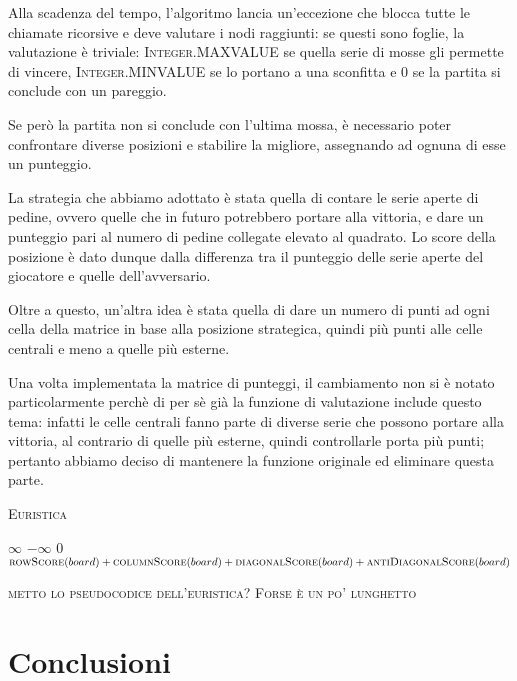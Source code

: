\documentclass{article}
\begin{document}
Alla scadenza del tempo, l'algoritmo lancia un'eccezione che blocca tutte le chiamate ricorsive e 
deve valutare i nodi raggiunti: se questi sono foglie, la valutazione è triviale: \textsc{Integer.MAXVALUE}
se quella serie di mosse gli permette di vincere, \textsc{Integer.MINVALUE} se lo portano a una sconfitta
e $0$ se la partita si conclude con un pareggio.

Se però la partita non si conclude con l'ultima mossa, è necessario poter confrontare diverse posizioni
e stabilire la migliore, assegnando ad ognuna di esse un punteggio.

La strategia che abbiamo adottato è stata quella di contare le serie aperte di pedine, ovvero quelle
che in futuro potrebbero portare alla vittoria, e dare un punteggio pari al numero di pedine collegate
elevato al quadrato. Lo score della posizione è dato dunque dalla differenza tra il punteggio delle serie
aperte del giocatore e quelle dell'avversario.

Oltre a questo, un'altra idea è stata quella di dare un numero di punti ad ogni cella della matrice
in base alla posizione strategica, quindi più punti alle celle centrali e meno a quelle più esterne.

Una volta implementata la matrice di punteggi, il cambiamento non si è notato particolarmente perchè
di per sè già la funzione di valutazione include questo tema: infatti le celle centrali fanno parte di
diverse serie che possono portare alla vittoria, al contrario di quelle più esterne, quindi controllarle porta
più punti; pertanto abbiamo deciso di mantenere la funzione originale ed eliminare questa parte.

\begin{algorithm}[H]
  \caption{\textsc{Euristica}}
  \label{alg:evaluate}
  \begin{algorithmic}
        \State \Return $\infty$
        \State \Return $-\infty$
        \State \Return $0$
      \Else
        \State \Return $\Call{rowScore}{board} + \Call{columnScore}{board} + 
        \Call{diagonalScore}{board} + \Call{antiDiagonalScore}{board}$
      \EndIf
    \EndProcedure      
  \end{algorithmic}
\end{algorithm}

\textsc{metto lo pseudocodice dell'euristica? Forse è un po' lunghetto}

\section{Conclusioni}
\end{document}

